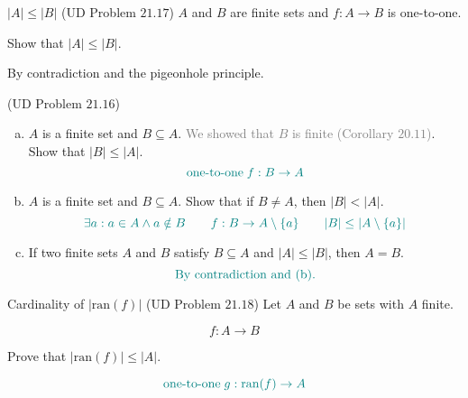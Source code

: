 \begin{frame}{}
  \begin{exampleblock}{$|A| \le |B|$ (UD Problem $21.17$)}
    $A$ and $B$ are finite sets and $f: A \to B$ is one-to-one. 
    
    Show that $|A| \le |B|$.
  \end{exampleblock}

  \pause

  \pause
  \vspace{0.30cm}
  \centerline{By contradiction and the pigeonhole principle.}
\end{frame}

\begin{frame}{}
  \begin{exampleblock}{(UD Problem $21.16$)}
    \begin{enumerate}[(a)]
      \item $A$ is a finite set and $B \subseteq A$. \textcolor{gray}{We showed that $B$ is finite (Corollary $20.11$)}. Show that $|B| \le |A|$.
	\pause
	\[
	  \textcolor{teal}{\text{one-to-one} \;f: B \to A}
	\]
      \item \pause $A$ is a finite set and $B \subseteq A$. Show that if $B \neq A$, then $|B| < |A|$.
	\pause
	\[
	  \textcolor{teal}{\exists a: a \in A \land a \notin B \qquad f: B \to A \setminus \{a\} \qquad |B| \le |A \setminus \{a\}|}
	\]
      \item \pause If two finite sets $A$ and $B$ satisfy $B \subseteq A$ and $|A| \le |B|$, then $A = B$.
	\pause
	\[
	  \textcolor{teal}{\text{By contradiction and (b).}}
	\]
    \end{enumerate}
  \end{exampleblock}
\end{frame}

\begin{frame}{}
  \begin{exampleblock}{Cardinality of $|\text{ran}(f)|$ (UD Problem $21.18$)}
    Let $A$ and $B$ be sets with $A$ finite.

    \[
      f: A \to B
    \]

    Prove that $|\text{ran}(f)| \le |A|$.
  \end{exampleblock}

  \pause
  \vspace{0.50cm}
  \[
    \textcolor{teal}{\text{one-to-one} \;g: \text{ran}(f) \to A}
  \]
  \pause
  \centerline{}
\end{frame}

